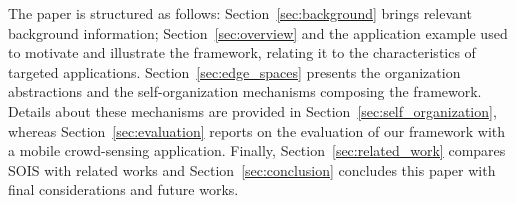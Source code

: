 The paper is structured as follows: Section~\ref{sec:background} brings relevant background information; Section~\ref{sec:overview} and the application example used to motivate and illustrate the framework, relating it to the characteristics of targeted applications. Section~\ref{sec:edge_spaces} presents the organization abstractions and the self-organization mechanisms composing the framework. Details about these mechanisms are provided in Section~\ref{sec:self_organization}, whereas Section~\ref{sec:evaluation} reports on the evaluation of our framework with a mobile crowd-sensing application. Finally, Section~\ref{sec:related_work} compares SOIS with related works and Section~\ref{sec:conclusion} concludes this paper with final considerations and future works.

